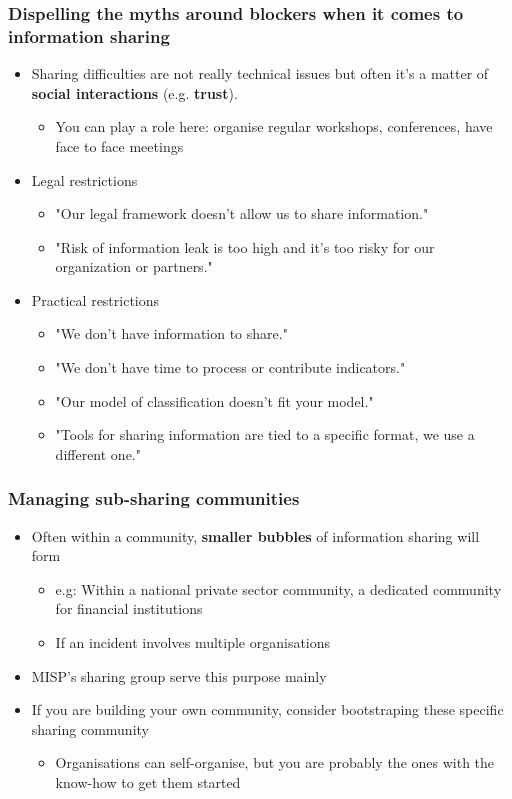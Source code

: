 \begin{frame}
    \frametitle{Dispelling the myths around blockers when it comes to information sharing}
    \begin{itemize}
        \item Sharing difficulties are not really technical issues but often it's a matter of {\bf social interactions} (e.g. {\bf trust}).
        \begin{itemize}
            \item You can play a role here: organise regular workshops, conferences, have face to face meetings
        \end{itemize}
        \item Legal restrictions
        \begin{itemize}
            \item "Our legal framework doesn't allow us to share information."
            \item "Risk of information leak is too high and it's too risky for our organization or partners."
        \end{itemize}
        \item Practical restrictions
        \begin{itemize}
            \item "We don't have information to share."
            \item "We don't have time to process or contribute indicators."
            \item "Our model of classification doesn't fit your model."
            \item "Tools for sharing information are tied to a specific format, we use a different one."
        \end{itemize}
    \end{itemize}
\end{frame}

\begin{frame}
    \frametitle{Managing sub-sharing communities}
    \begin{itemize}
        \item Often within a community, \textbf{smaller bubbles} of information sharing will form
        \begin{itemize}
            \item e.g: Within a national private sector community, a dedicated community for financial institutions
            \item If an incident involves multiple organisations
        \end{itemize}
        \item MISP's sharing group serve this purpose mainly
        \item If you are building your own community, consider bootstraping these specific sharing community
        \begin{itemize}
            \item Organisations can self-organise, but you are probably the ones with the know-how to get them started
        \end{itemize}
    \end{itemize}
\end{frame}

